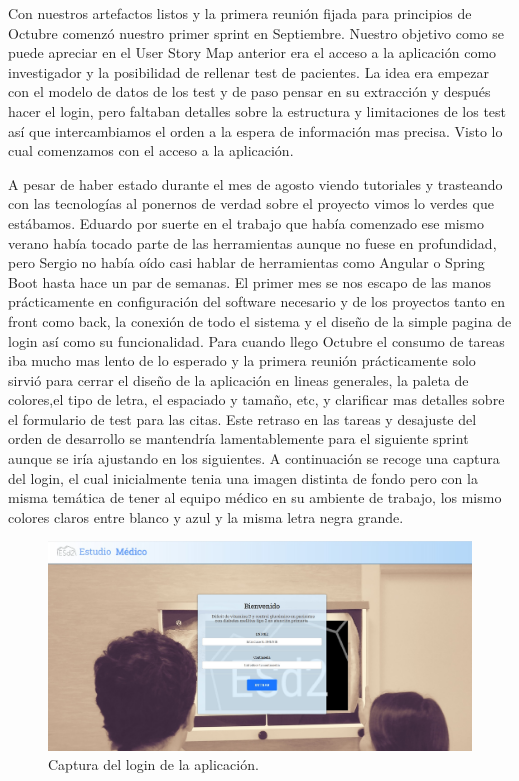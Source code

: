 Con nuestros artefactos listos y la primera reunión fijada para principios de Octubre comenzó nuestro primer sprint en Septiembre. Nuestro objetivo como se puede apreciar en el User Story Map anterior era el acceso a la aplicación como investigador y la posibilidad de rellenar test de pacientes. La idea era empezar con el modelo de datos de los test y de paso pensar en su extracción y después hacer el login, pero faltaban detalles sobre la estructura y limitaciones de los test así que intercambiamos el orden a la espera de información mas precisa. Visto lo cual comenzamos con el acceso a la aplicación.
\newline

A pesar de haber estado durante el mes de agosto viendo tutoriales y trasteando con las tecnologías al ponernos de verdad sobre el proyecto vimos lo verdes que estábamos. Eduardo por suerte en el trabajo que había comenzado ese mismo verano había tocado parte de las herramientas aunque no fuese en profundidad, pero Sergio no había oído casi hablar de herramientas como Angular o Spring Boot hasta hace un par de semanas. El primer mes se nos escapo de las manos prácticamente en configuración del software necesario y de los proyectos tanto en front como back, la conexión de todo el sistema y el diseño de la simple pagina de login así como su funcionalidad. Para cuando llego Octubre el consumo de tareas iba mucho mas lento de lo esperado y la primera reunión prácticamente solo sirvió para cerrar el diseño de la aplicación en lineas generales, la paleta de colores,el tipo de letra, el espaciado y tamaño, etc, y clarificar mas detalles sobre el formulario de test para las citas. Este retraso en las tareas y desajuste del orden de desarrollo se mantendría lamentablemente para el siguiente sprint aunque se iría ajustando en los siguientes. A continuación se recoge una captura del login, el cual inicialmente tenia una imagen distinta de fondo pero con la misma temática de tener al equipo médico en su ambiente de trabajo, los mismo colores claros entre blanco y azul y la misma letra negra grande.
\newline

 \begin{figure}[h]
    \centering
     \includegraphics[width=1\textwidth]{images/login.jpg}
    \caption{Captura del login de la aplicación.}
\end{figure}
\newpage

